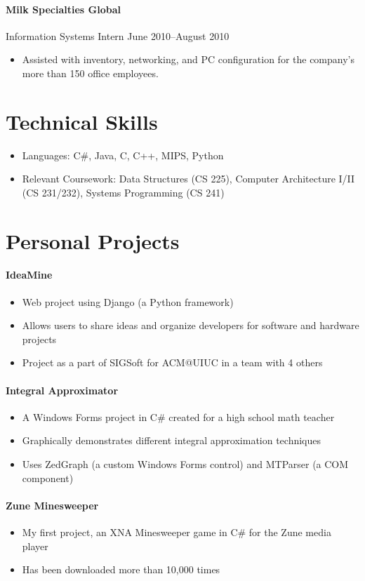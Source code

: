 \documentclass[letterpaper,12pt]{article}
\begin{document}
\paragraph {Milk Specialties Global}
Information Systems Intern \hfill June 2010--August 2010
\begin{itemize}
\item Assisted with inventory, networking, and PC configuration
for the company's more than 150 office employees.
\end{itemize}

\section*{Technical Skills}
\begin{itemize}
\item Languages: C\#, Java, C, C++, MIPS, Python
\item Relevant Coursework: Data Structures (CS 225),
Computer Architecture I/II (CS 231/232), Systems Programming (CS 241)
\end{itemize}

\section*{Personal Projects}
\paragraph{IdeaMine}
\begin{itemize}
\item Web project using Django (a Python framework)
\item Allows users to share ideas and organize developers
for software and hardware projects
\item Project as a part of SIGSoft for ACM@UIUC in a team with 4 others
\end{itemize}

\paragraph{Integral Approximator}
\begin{itemize}
\item A Windows Forms project in C\# created for a high school math teacher
\item Graphically demonstrates different integral approximation techniques
\item Uses ZedGraph (a custom Windows Forms control)
and MTParser (a COM component)
\end{itemize}

\paragraph{Zune Minesweeper}
\begin{itemize}
\item My first project, an XNA Minesweeper game in C\#
for the Zune media player
\item Has been downloaded more than 10,000 times
\end{itemize}
\end{document}
